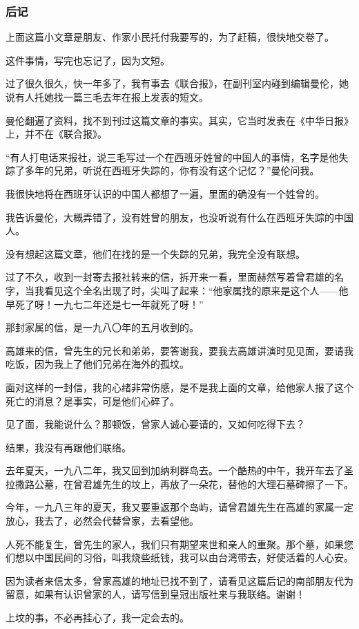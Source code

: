 \subsubsection*{后记}
\par 上面这篇小文章是朋友、作家小民托付我要写的，为了赶稿，很快地交卷了。
\par 这件事情，写完也忘记了，因为文短。
\par 过了很久很久，快一年多了，我有事去《联合报》，在副刊室内碰到编辑曼伦，她说有人托她找一篇三毛去年在报上发表的短文。
\par 曼伦翻遍了资料，找不到刊过这篇文章的事实。其实，它当时发表在《中华日报》上，并不在《联合报》。
\par “有人打电话来报社，说三毛写过一个在西班牙姓曾的中国人的事情，名字是他失踪了多年的兄弟，听说在西班牙失踪的，你有没有这个记忆？”曼伦问我。
\par 我很快地将在西班牙认识的中国人都想了一遍，里面的确没有一个姓曾的。
\par 我告诉曼伦，大概弄错了，没有姓曾的朋友，也没听说有什么在西班牙失踪的中国人。
\par 没有想起这篇文章，他们在找的是一个失踪的兄弟，我完全没有联想。
\par 过了不久，收到一封寄去报社转来的信，拆开来一看，里面赫然写着曾君雄的名字，当我看见这个全名出现了时，尖叫了起来：“他家属找的原来是这个人——他早死了呀！一九七二年还是七一年就死了呀！”
\par 那封家属的信，是一九八〇年的五月收到的。
\par 高雄来的信，曾先生的兄长和弟弟，要答谢我，要我去高雄讲演时见见面，要请我吃饭，因为我上了他们兄弟在海外的孤坟。
\par 面对这样的一封信，我的心绪非常伤感，是不是我上面的文章，给他家人报了这个死亡的消息？是事实，可是他们心碎了。
\par 见了面，我能说什么？那顿饭，曾家人诚心要请的，又如何吃得下去？
\par 结果，我没有再跟他们联络。
\par 去年夏天，一九八二年，我又回到加纳利群岛去。一个酷热的中午，我开车去了圣拉撒路公墓，在曾君雄先生的坟上，再放了一朵花，替他的大理石墓碑擦了一下。
\par 今年，一九八三年的夏天，我又要重返那个岛屿，请曾君雄先生在高雄的家属一定放心，我去了，必然会代替曾家，去看望他。
\par 人死不能复生，曾先生的家人，我们只有期望来世和亲人的重聚。那个墓，如果您们想以中国民间的习俗，叫我烧些纸钱，我可以由台湾带去，好使活着的人心安。
\par 因为读者来信太多，曾家高雄的地址已找不到了，请看见这篇后记的南部朋友代为留意，如果有认识曾家的人，请写信到皇冠出版社来与我联络。谢谢！
\par 上坟的事，不必再挂心了，我一定会去的。


